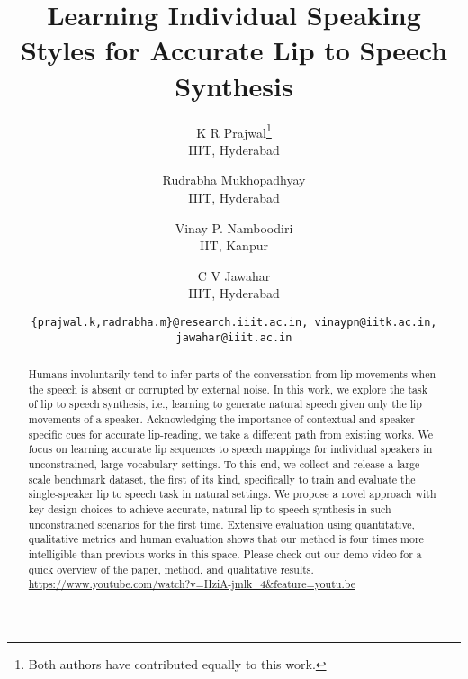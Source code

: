 \documentclass[10pt,twocolumn,letterpaper]{article}
\begin{document}
\newcommand{\modelnamewithoutspace}{Lip2Wav} \newcommand{\modelname}{Lip2Wav } 

\title{Learning Individual Speaking Styles for Accurate Lip to Speech Synthesis}

\author{K R Prajwal\thanks{Both authors have contributed equally to this work.}\\
IIIT, Hyderabad\\
\and
Rudrabha Mukhopadhyay\footnotemark[1]\\
IIIT, Hyderabad\\
\and
Vinay P. Namboodiri\\
IIT, Kanpur\\
\and
C V Jawahar\\
IIIT, Hyderabad\\
\and
{{\tt\small\{prajwal.k,radrabha.m\}@research.iiit.ac.in, vinaypn@iitk.ac.in, jawahar@iiit.ac.in}}
}

\maketitle


\begin{abstract}
   Humans involuntarily tend to infer parts of the conversation from lip movements when the speech is absent or corrupted by external noise. In this work, we explore the task of lip to speech synthesis, i.e., learning to generate natural speech given only the lip movements of a speaker. Acknowledging the importance of contextual and speaker-specific cues for accurate lip-reading, we take a different path from existing works. We focus on learning accurate lip sequences to speech mappings for individual speakers in unconstrained, large vocabulary settings. To this end, we collect and release a large-scale benchmark dataset, the first of its kind, specifically to train and evaluate the single-speaker lip to speech task in natural settings. We propose a novel approach with key design choices to achieve accurate, natural lip to speech synthesis in such unconstrained scenarios for the first time. Extensive evaluation using quantitative, qualitative metrics and human evaluation shows that our method is four times more intelligible than previous works in this space. Please check out our demo video for a quick overview of the paper, method, and qualitative results. \url{https://www.youtube.com/watch?v=HziA-jmlk_4&feature=youtu.be}
\end{abstract}
\end{document}
